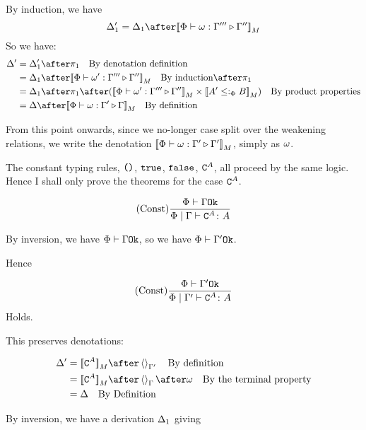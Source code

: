 \documentclass{report}
\begin{document}
        By induction, we have
        \begin{equation}
            \D_1' = \D_1 \after \deno{\ewrel{\P}{\w}{\G'''}{\G''}}
        \end{equation}
        So we have:
        \begin{align}
            \D' &= \D_1' \after \p\qt{By denotation definition}\\
            & = \D_1\after\deno{\ewrel{\P}{\w'}{\G'''}{\G''}}\qt{By induction}\after\p \\
            & = \D_1\after\p\after(\deno{\ewrel{\P}{\w'}{\G'''}{\G''}}\times\deno{A' \subtypep B})\qt{By product properties}\\
            & = \D\after\deno{\ewrel{\P}{\w}{\G'}{\G}}\qt{By definition}
        \end{align}


    From this point onwards, since we no-longer case split over the weakening relations, we write the denotation ${\bf [\![}\Phi\vdash \omega : \Gamma' \triangleright \Gamma'{\bf ]\!]}_M$, simply as $\omega$.


    The constant typing rules, $\texttt{()}$, $\texttt{true}$, $\texttt{false}$, $\texttt{C}^{A}$, all proceed by the same logic. Hence I shall only prove the theorems for the case $\texttt{C}^{A}$.

    \begin{equation}
        (\text{Const}) \frac{\Phi\vdash \Gamma \texttt{Ok}}{\Phi\mid\Gamma \vdash \texttt{C}^{A} \colon A}
    \end{equation}

    By inversion, we have $\Phi\vdash \Gamma \texttt{Ok}$, so we have $\Phi\vdash \Gamma' \texttt{Ok}$.

    Hence

    \begin{equation}
        (\text{Const}) \frac{\Phi\vdash \Gamma' \texttt{Ok}}{\Phi\mid\Gamma' \vdash \texttt{C}^{A} \colon A}
    \end{equation}
    Holds.

    This preserves denotations:


    \begin{align}
        \D' & = \deno{\const{A}} \after \term{\G'}\qt{By definition}\\
        & = \deno{\const{A}} \after \term{\G}\after \w \qt{By the terminal property}\\
        & = \D\qt{By Definition}\\
    \end{align}


    By inversion, we have a derivation $\Delta_1$ giving
\end{document}
